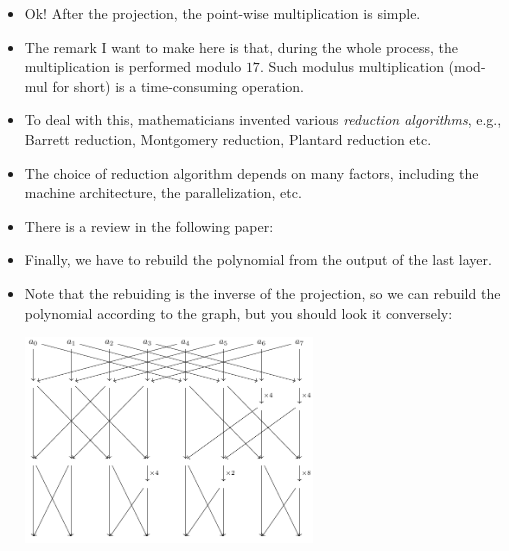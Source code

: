\begin{frame}
    \begin{itemize}
        \item Ok! After the projection, the point-wise multiplication is simple. 
        \item The remark I want to make here is that, during the whole process, the multiplication is performed modulo \( 17 \). 
        Such modulus multiplication (mod-mul for short) is a time-consuming operation.
        \item To deal with this, mathematicians invented various \emph{reduction algorithms}, e.g., Barrett reduction, Montgomery reduction, Plantard reduction etc.
        \item The choice of reduction algorithm depends on many factors, including the machine architecture, the parallelization, etc.
        \item There is a review in the following paper:

    \end{itemize}
\end{frame}

\begin{frame}
\begin{itemize}
    \item Finally, we have to rebuild the polynomial from the output of the last layer.
    \item Note that the rebuiding is the inverse of the projection, so we can rebuild the polynomial according to the graph, but you should look it conversely:
    \begin{center}
        \includegraphics[width=0.6\textwidth]{tikzcd5.pdf}
    \end{center}
\end{itemize}
\end{frame}
